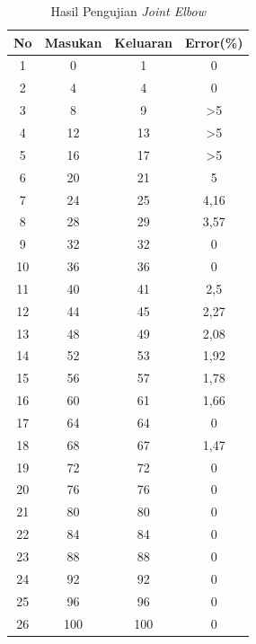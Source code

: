  \begin{longtable}{|c|c|c|c|}
 	\caption{Hasil Pengujian \textit{Joint Elbow}}
 	\label{tbl.elbow}\\
 	\hline
 	\rowcolor[HTML]{656565} 
 	No & Masukan & Keluaran & Error(\%)       \\ \hline
 	\endfirsthead
 	\endhead
 	1  & 0       & 1        & 0           \\ \hline
 	2  & 4       & 4        & 0           \\ \hline
 	3  & 8       & 9        & >5      \\ \hline
 	4  & 12      & 13       & >5  \\ \hline
 	5  & 16      & 17       & >5         \\ \hline
 	6  & 20      & 21       & 5           \\ \hline
 	7  & 24      & 25       & 4,16 \\ \hline
 	8  & 28      & 29       & 3,57 \\ \hline
 	9  & 32      & 32       & 0           \\ \hline
 	10 & 36      & 36       & 0           \\ \hline
 	11 & 40      & 41       & 2,5         \\ \hline
 	12 & 44      & 45       & 2,27 \\ \hline
 	13 & 48      & 49       & 2,08 \\ \hline
 	14 & 52      & 53       & 1,92 \\ \hline
 	15 & 56      & 57       & 1,78 \\ \hline
 	16 & 60      & 61       & 1,66 \\ \hline
 	17 & 64      & 64       & 0           \\ \hline
 	18 & 68      & 67       & 1,47 \\ \hline
 	19 & 72      & 72       & 0           \\ \hline
 	20 & 76      & 76       & 0           \\ \hline
 	21 & 80      & 80       & 0           \\ \hline
 	22 & 84      & 84       & 0           \\ \hline
 	23 & 88      & 88       & 0           \\ \hline
 	24 & 92      & 92       & 0           \\ \hline
 	25 & 96      & 96       & 0           \\ \hline
 	26 & 100     & 100      & 0           \\ \hline

\end{longtable}

